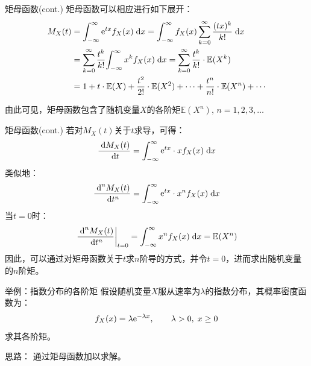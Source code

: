 \documentclass[t]{beamer}
\newcommand{\dif}{{\;\rm d}}
\newcommand{\E}{\mathbb{E}}
\begin{document}
  \begin{frame}{矩母函数(cont.)}
    矩母函数可以相应进行如下展开：
    \begin{equation*}\begin{split}
    M_X(t)&=\int^{\infty}_{-\infty}{\rm e}^{tx}f_X(x)\dif x
    =\int^{\infty}_{-\infty}f_X(x)\sum^{\infty}_{k=0}\frac{(tx)^k}{k!}\dif
    x \\
    &=\sum^{\infty}_{k=0}
    \frac{t^k}{k!}{\int^{\infty}_{-\infty}x^kf_X(x)\dif
    x}=\sum^{\infty}_{k=0} \frac{t^k}{k!}\cdot{\E(X^k)}\\
    &=1+t\cdot
    {\E(X)}+\frac{t^2}{2!}\cdot{\E(X^2)}+\cdots+\frac{t^n}{n!}\cdot{\E(X^n)}+\cdots
    \end{split}
    \end{equation*}
  
    由此可见，矩母函数包含了随机变量$X$的各阶矩$\E(X^n)$, $n=1,2,3,\ldots$
  \end{frame}
  
  \begin{frame}{矩母函数(cont.)}
    若对$M_X(t)$关于$t$求导，可得：
    \begin{equation*}\frac{\dif M_X(t)}{\dif
    t}=\int^{\infty}_{-\infty}{\rm e}^{tx}\cdot xf_X(x)\dif x
    \end{equation*}
    类似地：
    $$\frac{\dif^{n} M_X(t)}{\dif t^n}=\int^{\infty}_{-\infty}{\rm
    e}^{tx}\cdot x^nf_X(x)\dif x$$
    当$t=0$时：
    \begin{equation*}{\left.\frac{\dif^{n} M_X(t)}{\dif
    t^n}\right|_{t=0}}=\int^{\infty}_{-\infty} x^nf_X(x)\dif
    x=\E(X^n) \end{equation*}
    因此，可以通过对矩母函数关于$t$求$n$阶导的方式，并令$t=0$，进而求出随机变量的$n$阶矩。
  
  \end{frame}



  \begin{frame}{举例：指数分布的各阶矩}
    假设随机变量$X$服从速率为$\lambda$的指数分布，其概率密度函数为：
    \begin{equation*}f_X(x)=\lambda {\rm e}^{-\lambda x},\qquad
    \lambda>0, \; x\ge0 \end{equation*}
      求其各阶矩。
  
      \begin{block}{思路：}
        通过矩母函数加以求解。
      \end{block}
  \end{frame}
\end{document}
